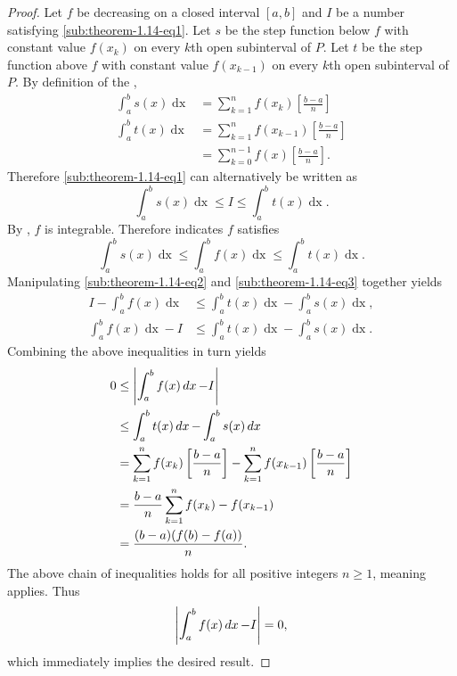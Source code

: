 \documentclass{report}
\begin{document}
\begin{proof}

  Let $f$ be decreasing on a closed interval $[a, b]$ and $I$ be a number
    satisfying \eqref{sub:theorem-1.14-eq1}.
  Let $s$ be the step function below $f$ with constant value $f(x_k)$
    on every $k$th open subinterval of $P$.
  Let $t$ be the step function above $f$ with constant value $f(x_{k-1})$
    on every $k$th open subinterval of $P$.
  By definition of the ,
    \begin{align*}
      \int_a^b s(x) \mathop{dx}
        & = \sum_{k=1}^n f(x_k) \left[\frac{b - a}{n}\right] \\
      \int_a^b t(x) \mathop{dx}
        & = \sum_{k=1}^n f(x_{k-1}) \left[\frac{b - a}{n}\right] \\
        & = \sum_{k=0}^{n-1} f(x) \left[\frac{b - a}{n}\right].
    \end{align*}
  Therefore \eqref{sub:theorem-1.14-eq1} can alternatively be written as
    \begin{equation}
      \label{sub:theorem-1.14-eq2}
      \int_a^b s(x) \mathop{dx} \leq I \leq \int_a^b t(x) \mathop{dx}.
    \end{equation}
  By , $f$ is integrable.
  Therefore  indicates $f$ satisfies
    \begin{equation}
      \label{sub:theorem-1.14-eq3}
      \int_a^b s(x) \mathop{dx}
        \leq \int_a^b f(x) \mathop{dx}
        \leq \int_a^b t(x) \mathop{dx}.
    \end{equation}
  Manipulating \eqref{sub:theorem-1.14-eq2} and \eqref{sub:theorem-1.14-eq3}
    together yields
    \begin{align*}
      I - \int_a^b f(x) \mathop{dx}
        & \leq \int_a^b t(x) \mathop{dx} - \int_a^b s(x) \mathop{dx}, \\
      \int_a^b f(x) \mathop{dx} - I
        & \leq \int_a^b t(x) \mathop{dx} - \int_a^b s(x) \mathop{dx}.
    \end{align*}
  Combining the above inequalities in turn yields
    \begin{align*}
      0
        & \leq \left|\int_a^b f(x) \mathop{dx} - I\right| \\
        & \leq \int_a^b t(x) \mathop{dx} - \int_a^b s(x) \mathop{dx} \\
        & = \sum_{k=1}^n f(x_k) \left[ \frac{b - a}{n} \right] -
            \sum_{k=1}^n f(x_{k-1}) \left[ \frac{b - a}{n} \right] \\
        & = \frac{b - a}{n} \sum_{k=1}^n f(x_k) - f(x_{k-1}) \\
        & = \frac{(b - a)(f(b) - f(a))}{n}.
    \end{align*}
  The above chain of inequalities holds for all positive integers $n \geq 1$,
    meaning  applies.
  Thus $$\left|\int_a^b f(x) \mathop{dx} - I\right| = 0,$$ which immediately implies
    the desired result.

\end{proof}
\end{document}

